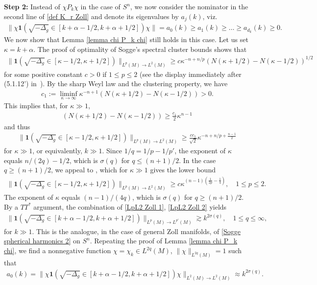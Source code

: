 \documentclass[12pt]{amsart}
\begin{document}
\textbf{Step 2:} Instead of $\chi P_k\chi$ in the case of $S^n$, we now consider the nominator in the second line of \eqref{def K_r Zoll} and denote its eigenvalues by $a_j(k)$, viz.
\begin{align}\label{list of aj(k) Zoll}
    \|\chi\mathbf{1}(\sqrt{-\Delta_g}\in[k+\alpha-1/2,k+\alpha+1/2])\chi\|=a_0(k)\geq a_1(k) \geq \ldots \geq a_{d_k}(k)\geq 0.
\end{align}
We now show that Lemma \ref{lemma chi P_k chi} still holds in this case. Let us set $\kappa=k+\alpha$. The proof of optimality of Sogge’s spectral cluster bounds shows that
\begin{align}
    \|\mathbf{1}(\sqrt{-\Delta_g}\in[\kappa-1/2,\kappa+1/2])\|_{L^p(M)\to L^2(M)}\geq c \kappa^{-n+n/p}\left(N(\kappa+1/2)-N(\kappa-1/2)\right)^{1/2}
\end{align}
for some positive constant $c>0$ if $1\leq p\leq 2$ (see the display immediately after (5.1.12') in~\cite{MR3645429}). By the sharp Weyl law and the clustering property, we have 
\begin{align}
  c_1:=\liminf_{\kappa\to\infty}  \kappa^{-n+1}\left(N(\kappa+1/2)-N(\kappa-1/2)\right)>0.
\end{align}
This implies that, for $\kappa\gg 1$,  
\begin{align}
 \left(N(\kappa+1/2)-N(\kappa-1/2)\right)\geq \frac{c_1}{2}\kappa^{n-1}
\end{align}
and thus
\begin{align}\label{LpL2 Zoll 1}
    \|\mathbf{1}(\sqrt{-\Delta_g}\in[\kappa-1/2,\kappa+1/2])\|_{L^p(M)\to L^{2}(M)}\geq \frac{cc_1}{\sqrt{2}} \kappa^{-n+n/p+\frac{n-1}{2}}
\end{align}
for $\kappa\gg 1$, or equivalently, $k\gg 1$. Since $1/q=1/p-1/p'$, the exponent of $\kappa$ equals $n/(2q)-1/2$, which is $\sigma(q)$ for $q\leq (n+1)/2$. In the case $q\geq (n+1)/2$, we appeal to \cite[(5.1.13)]{MR3645429}, which for $\kappa\gg 1$ gives the lower bound
\begin{align}\label{LpL2 Zoll 2}
    \|\mathbf{1}(\sqrt{-\Delta_g}\in[\kappa-1/2,\kappa+1/2])\|_{L^p(M)\to L^2(M)}\geq c \kappa^{(n-1)(\frac{1}{2p}-\frac{1}{4})},\quad 1\leq p\leq 2.
\end{align}
The exponent of $\kappa$ equals $(n-1)/(4q)$, which is $\sigma(q)$ for $q\geq (n+1)/2$. By a $TT^*$ argument, the combination of \eqref{LpL2 Zoll 1}, \eqref{LpL2 Zoll 2} yields
\begin{align}\label{LpL2 Zoll 3}
    \|\mathbf{1}(\sqrt{-\Delta_g}\in[k+\alpha-1/2,k+\alpha+1/2])\|_{L^p(M)\to L^{p'}(M)}\gtrsim k^{2\sigma(q)},\quad 1\leq q\leq\infty,
\end{align}
for $k\gg 1$. This is the analogue, in the case of general Zoll manifolds, of \eqref{Sogge spherical harmonics 2} on $S^n$. Repeating the proof of Lemma \ref{lemma chi P_k chi}, we find 
a nonnegative function $\chi=\chi_k\in L^{2q}(M)$, $\|\chi\|_{L^{2q}(M)}=1$ such that 
 \begin{align}\label{chi saturates cluster bound Zoll}
   a_0(k)=\|\chi\mathbf{1}(\sqrt{-\Delta_g}\in[k+\alpha-1/2,k+\alpha+1/2])\chi\|_{L^2(M)\to L^{2}(M)}\approx k^{2\sigma(q)}.
\end{align}
\end{document}
